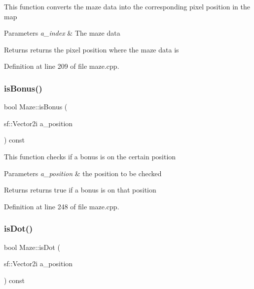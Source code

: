 This function converts the maze data into the corresponding pixel position in the map


\begin{DoxyParams}{Parameters}
{\em a\+\_\+index} & The maze data \\
\hline
\end{DoxyParams}
\begin{DoxyReturn}{Returns}
returns the pixel position where the maze data is 
\end{DoxyReturn}


Definition at line 209 of file maze.\+cpp.

\mbox{\label{class_maze_a63fd7d817f664bb7b157db12479d89be}} 
\subsubsection{\texorpdfstring{is\+Bonus()}{isBonus()}}
{\footnotesize\ttfamily bool Maze\+::is\+Bonus (\begin{DoxyParamCaption}\item[{sf\+::\+Vector2i}]{a\+\_\+position }\end{DoxyParamCaption}) const}

This function checks if a bonus is on the certain position


\begin{DoxyParams}{Parameters}
{\em a\+\_\+position} & the position to be checked \\
\hline
\end{DoxyParams}
\begin{DoxyReturn}{Returns}
returns true if a bonus is on that position 
\end{DoxyReturn}


Definition at line 248 of file maze.\+cpp.

\mbox{\label{class_maze_a26a1d805927e965b54ffa261a87600b9}} 
\subsubsection{\texorpdfstring{is\+Dot()}{isDot()}}
{\footnotesize\ttfamily bool Maze\+::is\+Dot (\begin{DoxyParamCaption}\item[{sf\+::\+Vector2i}]{a\+\_\+position }\end{DoxyParamCaption}) const}

